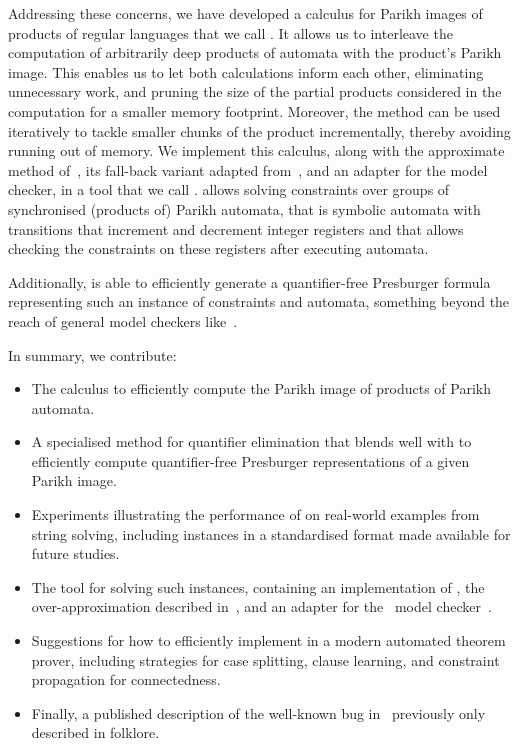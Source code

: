 \documentclass[acmsmall,review,anonymous]{acmart}\settopmatter{printfolios=true,printccs=false,printacmref=true}
\theoremstyle{definition}
\begin{document}
Addressing these concerns, we have developed a calculus for Parikh images of
products of regular languages that we call \Calculus{}. It allows us to
interleave the computation of arbitrarily deep products of automata with the
product's Parikh image. This enables us to let both calculations inform each
other, eliminating unnecessary work, and pruning the size of the partial
products considered in the computation for a smaller memory footprint. Moreover,
the method can be used iteratively to tackle smaller chunks of the product
incrementally, thereby avoiding running out of memory. We implement this
calculus, along with the approximate method of~\cite{approximate-parikh}, its
fall-back variant adapted from~\cite{generate-parikh-image}, and an adapter for
the \Nuxmv{} model checker, in a tool that we call \Catra{}. \Catra{} allows
solving constraints over groups of synchronised (products of) Parikh automata,
that is symbolic automata with transitions that increment and decrement integer
registers and that allows checking the constraints on these registers after
executing automata.

Additionally, \Catra{} is able to efficiently generate a quantifier-free
Presburger formula representing such an instance of constraints and automata,
something beyond the reach of general model checkers like~\Nuxmv.

In summary, we contribute:
\begin{itemize}
\item The \Calculus{} calculus to efficiently compute the Parikh image of products of Parikh automata.
\item A specialised method for quantifier elimination that blends well with \Calculus{} to efficiently compute quantifier-free Presburger representations of a given Parikh image.
\item Experiments illustrating the performance of \Calculus{} on real-world examples from string solving, including \NrBenchmarks{} instances in a standardised format made available for future studies.
\item The \Catra{} tool for solving such instances, containing an implementation of \Calculus{}, the over-approximation described in~\cite{approximate-parikh}, and an adapter for the~\Nuxmv{} model checker~\cite{nuxmv}.
\item Suggestions for how to efficiently implement \Calculus{} in a modern automated theorem prover, including strategies for case splitting, clause learning, and constraint propagation for connectedness.
\item Finally, a published description of the well-known bug in~\cite{generate-parikh-image} previously only described in folklore.
\end{itemize}
\end{document}
